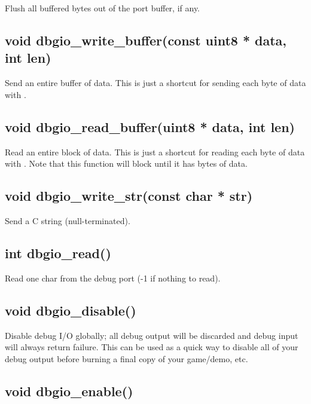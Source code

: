 \documentclass[english]{report}
\begin{document}
Flush all buffered bytes out of the port buffer, if any.


\subsection{void dbgio\_write\_buffer(const uint8 * data, int len)}

Send an entire buffer of data. This is just a shortcut for sending
each byte of data with .


\subsection{void dbgio\_read\_buffer(uint8 * data, int len)}

Read an entire block of data. This is just a shortcut for reading
each byte of data with . Note that this
function will block until it has  bytes of data.


\subsection{void dbgio\_write\_str(const char * str)}

Send a C string (null-terminated).


\subsection{int dbgio\_read()}

Read one char from the debug port (-1 if nothing to read).


\subsection{void dbgio\_disable()}

Disable debug I/O globally; all debug output will be discarded and
debug input will always return failure. This can be used as a quick
way to disable all of your debug output before burning a final
copy of your game/demo, etc.


\subsection{void dbgio\_enable()}
\end{document}
